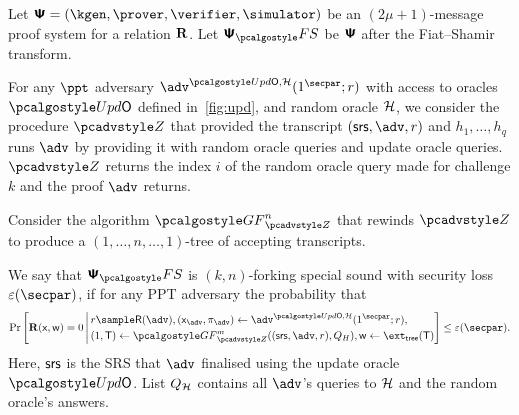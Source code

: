 \begin{definition}
	Let $\proofsystem = (\kgen, \prover, \verifier, \simulator)$ be an
	$(2 \mu + 1)$-message proof system for a relation $\mathbf{R}$.  Let $\proofsystem_\fs$ be
	$\bm{\mathsf{\Psi}}$ after the Fiat--Shamir transform.
	
	For any $\ppt$ adversary $\advse^{\initU,
		\ro} (1^\secpar; r)$ with access to oracles $\initU$ defined in~\cref{fig:upd}, and random oracle $\mathcal{H}$, we consider the procedure $\zdv$ that provided the transcript $(\srs, \adv, r)$ and $h_1, \ldots, h_q$ runs $\adv$ by providing it with random oracle queries
	and update oracle queries.
	$\zdv$ returns the index $i$ of the
	random oracle query made for challenge $k$ and the proof $\adv$ returns.
	
	Consider the algorithm $\genforking_{\zdv}^{n}$
	that rewinds $\zdv$ to produce a $(1,\dots, n,\dots, 1)$-tree of
	accepting transcripts.
	
	We say that $\psfs$ is $(k,n)$-forking special sound with security loss $\eps(\secpar)$, if
	for any PPT adversary the probability that
	\begin{align*}
	\Pr\left[
	\REL(\inp, \wit) = 0
	\,\Biggl|\,
	\begin{aligned}
	& r \sample \RND{\advse},
	(\inp_{\advse}, \zkproof_{\advse}) \gets \advse^{\initU, \ro} (1^\secpar; r), \\
	&    (1, \tree) \gets \genforking_{\zdv}^{m}((\srs,\adv,r),Q_{H}),
	\wit \gets \extt(\tree)
	\end{aligned}
	\right] \leq \eps(\secpar).
	\end{align*}
	Here, $\mathsf{srs}$ is the SRS that $\advse$ finalised using the update oracle $\initU$.
	List $Q_{\mathcal{H}}$ contains all $\advse$'s
	queries to $\mathcal{H}$ and the random oracle's answers.
\end{definition}



